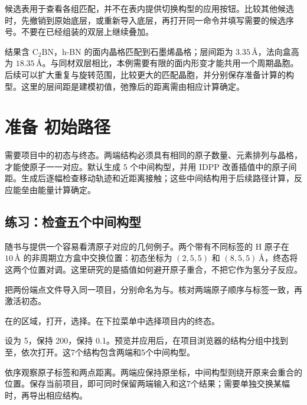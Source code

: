 候选表用于查看各组匹配，并不在表内提供切换构型的应用按钮。比较其他候选时，先撤销到原始底层，或重新导入底层，再打开同一命令并填写需要的候选序号。不要在已经组装的双层上继续叠加。

结果含 $\mathrm{C_2BN}$，h-BN 的面内晶格匹配到石墨烯晶格；层间距为 $3.35\,\text{\AA}$，法向盒高为 $18.35\,\text{\AA}$。与同材双层相比，本例需要有限的面内形变才能共用一个周期晶胞。后续可以扩大重复与旋转范围，比较更大的匹配晶胞，并分别保存准备计算的构型。这里的层间距是建模初值，弛豫后的距离需由相应计算确定。



\section{准备  初始路径}

需要项目中的初态与终态。两端结构必须具有相同的原子数量、元素排列与晶格，才能使原子一一对应。默认生成 5 个中间构型，并用 IDPP 改善插值中的原子间距。生成后逐幅检查移动轨迹和近距离接触；这些中间结构用于后续路径计算，反应能垒由能量计算确定。



\subsection{练习：检查五个中间构型}

随书与提供一个容易看清原子对应的几何例子。两个带有不同标签的 H 原子在 $10\,\text{\AA}$ 的非周期立方盒中交换位置：初态坐标为 $(2,5,5)$ 和 $(8,5,5)\,\text{\AA}$，终态将这两个位置对调。这里研究的是插值如何避开原子重合，不把它作为氢分子反应。

\begin{steps}
  \item 把两份端点文件导入同一项目，分别命名为与。核对两端原子顺序与标签一致，再激活初态。
  \item 在的区域，打开，选择。在下拉菜单中选择项目内的终态。
  \item {}设为 5，保持 200，保持 0.1。预览并应用后，在项目浏览器的结构分组中找到至，依次打开。这7个结构包含两端和5个中间构型。
  \item 依序观察原子标签和两点距离。两端应保持原坐标，中间构型则绕开原来会重合的位置。保存当前项目，即可同时保留两端输入和这7个结果；需要单独交换某幅时，再导出相应结构。
\end{steps}

